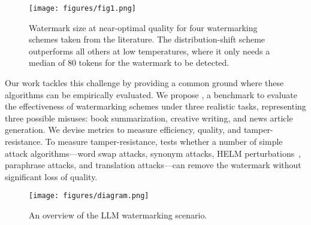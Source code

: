 \begin{figure}[t]
  \begin{center}
    \texttt{[image: figures/fig1.png]}
  \end{center}
  \caption{Watermark size at near-optimal quality for four watermarking schemes taken from the literature. 
    The distribution-shift scheme~\cite{kirchenbauer_watermark_2023} outperforms all others at low temperatures, 
    where it only needs a median of 80 tokens for the watermark to be detected.}
  \label{fig:aggregate}
\end{figure}

Our work tackles this challenge by providing a common ground where these algorithms can be empirically evaluated.
%
We propose \benchmarkname{}, a benchmark to evaluate the effectiveness of watermarking schemes under three realistic tasks, representing three possible misuses: book summarization, creative writing, and news article generation. 
%
We devise metrics to measure efficiency, quality, and tamper-resistance.
%
To measure tamper-resistance, \benchmarkname{} tests whether a number of simple attack algorithms---word swap attacks, synonym attacks, HELM perturbations~\citep{liang_holistic_2022}, paraphrase attacks, and translation attacks---can remove the watermark without significant loss of quality.

\begin{figure*}[ht]
    \texttt{[image: figures/diagram.png]}
    \caption{An overview of the LLM watermarking scenario.}\label{fig:diagram}
\end{figure*}


